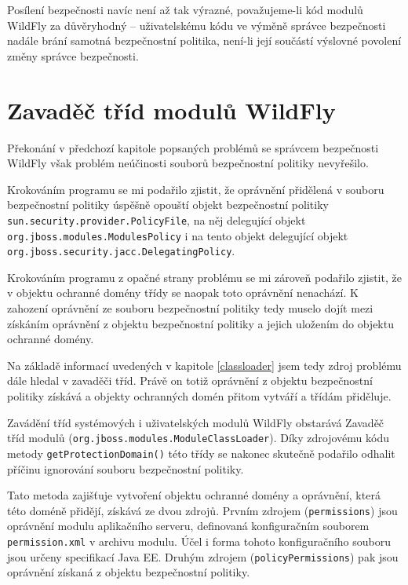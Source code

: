 Posílení bezpečnosti navíc není až tak výrazné, považujeme-li kód modulů WildFly za důvěryhodný -- uživatelskému kódu ve výměně správce bezpečnosti nadále brání samotná bezpečnostní politika, není-li její součástí výslovné povolení změny správce bezpečnosti.

\section{Zavaděč tříd modulů WildFly}

Překonání v předchozí kapitole popsaných problémů se správcem bezpečnosti WildFly však problém neúčinosti souborů bezpečnostní politiky nevyřešilo.

Krokováním programu se mi podařilo zjistit, že oprávnění přidělená v souboru bezpečnostní politiky úspěšně opouští objekt bezpečnostní politiky {\tt sun.security.provider.PolicyFile}, na něj delegující objekt {\tt org.jboss.modules.ModulesPolicy} i na tento objekt delegující objekt {\tt org.jboss.security.jacc.DelegatingPolicy}.

Krokováním programu z opačné strany problému se mi zároveň podařilo zjistit, že v objektu ochranné domény třídy se naopak toto oprávnění nenachází. K zahození oprávnění ze souboru bezpečnostní politiky tedy muselo dojít mezi získáním oprávnění z objektu bezpečnostní politiky a jejich uložením do objektu ochranné domény.

Na základě informací uvedených v kapitole \ref{classloader} jsem tedy zdroj problému dále hledal v zavaděči tříd. Právě on totiž oprávnění z objektu bezpečnostní politiky získává a objekty ochranných domén přitom vytváří a třídám přiděluje.

Zavádění tříd systémových i uživatelských modulů WildFly obstarává Zavaděč tříd modulů ({\tt org.jboss.modules.ModuleClassLoader}). Díky zdrojovému kódu metody {\tt getProtectionDomain()} této třídy se nakonec skutečně podařilo odhalit příčinu ignorování souboru bezpečnostní politiky.

Tato metoda zajišťuje vytvoření objektu ochranné domény a oprávnění, která této doméně přidějí, získává ze dvou zdrojů. Prvním zdrojem ({\tt permissions}) jsou oprávnění modulu aplikačního serveru, definovaná konfiguračním souborem {\tt permission.xml} v archivu modulu. Účel i forma tohoto konfiguračního souboru jsou určeny specifikací Java EE. \cite{javaEEspec} Druhým zdrojem ({\tt policyPermissions}) pak jsou oprávnění získaná z objektu bezpečnostní politiky.

